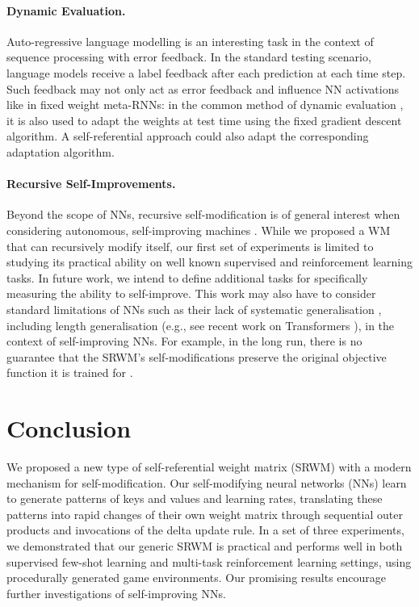 \documentclass[nohyperref]{article}
\theoremstyle{plain}
\theoremstyle{definition}
\theoremstyle{remark}
\begin{document}
\paragraph{Dynamic Evaluation.}
Auto-regressive language modelling is
an interesting task  
in the context of sequence processing with error feedback.
In the standard testing scenario, language models receive a label feedback after each prediction at each time step.
Such feedback may not only act as error feedback and influence NN activations like in fixed weight meta-RNNs: in the common method of dynamic evaluation \citep{mikolov2010recurrent, KrauseK0R18}, it is also used to adapt the weights at test time using the fixed gradient descent algorithm.
A self-referential approach could also adapt the corresponding adaptation algorithm. 

\paragraph{Recursive Self-Improvements.}
Beyond the scope of NNs,
recursive self-modification \citep{good1965, Eden2013} is of general interest when considering
autonomous, self-improving machines \citep{Schmidhuber:87long, Schmidhuber:04agi, wang2007logic, nivel2009self, SteunebrinkTS16, wang2018self}.
While we proposed a WM that can recursively modify itself, our first set of experiments is limited to
studying its practical ability on well known supervised and reinforcement learning tasks.
In future work, we intend to define additional tasks for specifically measuring the ability to self-improve.
This work may also have to consider 
standard limitations of NNs
such as their lack of systematic generalisation \citep{fodor1988connectionism}, including length generalisation (e.g., see recent work on Transformers \citep{csordas2021neural}), in
the context of self-improving NNs.
For example, in the long run, there is no guarantee that the SRWM's self-modifications preserve the original objective function it is trained for \citep{hubinger2019risks}.

\section{Conclusion}
We proposed a new type of self-referential weight matrix (SRWM) with a modern mechanism for self-modification.
Our self-modifying neural networks (NNs) learn to generate patterns of keys and values and learning rates, translating these patterns into rapid changes of their own weight matrix through sequential outer products and invocations of the delta update rule.
In a set of three experiments, we demonstrated that our generic SRWM is practical and performs well in both supervised few-shot learning and multi-task reinforcement learning settings, using procedurally generated game environments. Our promising results encourage further investigations of self-improving NNs.
\end{document}
